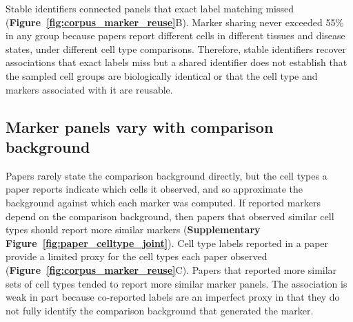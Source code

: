 \documentclass[10pt,twocolumn]{article}
\theoremstyle{plain}
\theoremstyle{definition}
\theoremstyle{remark}
\begin{document}
Stable identifiers connected panels that exact label matching missed (\textbf{Figure~\ref{fig:corpus_marker_reuse}}B).  Marker sharing never exceeded 55\% in any group because papers report different cells in different tissues and disease states, under different cell type comparisons. Therefore, stable identifiers recover associations that exact labels miss but a shared identifier does not establish that the sampled cell groups are biologically identical or that the cell type and markers associated with it are reusable.

\subsection*{Marker panels vary with comparison background}

Papers rarely state the comparison background directly, but the cell types a paper reports indicate which cells it observed, and so approximate the background against which each marker was computed. If reported markers depend on the comparison background, then papers that observed similar cell types should report more similar markers (\textbf{Supplementary Figure~\ref{fig:paper_celltype_joint}}). Cell type labels reported in a paper provide a limited proxy for the cell types each paper observed (\textbf{Figure~\ref{fig:corpus_marker_reuse}}C).  Papers that reported more similar sets of cell types tended to report more similar marker panels. The association is weak in part because co-reported labels are an imperfect proxy in that they do not fully identify the comparison background that generated the marker.
\end{document}
